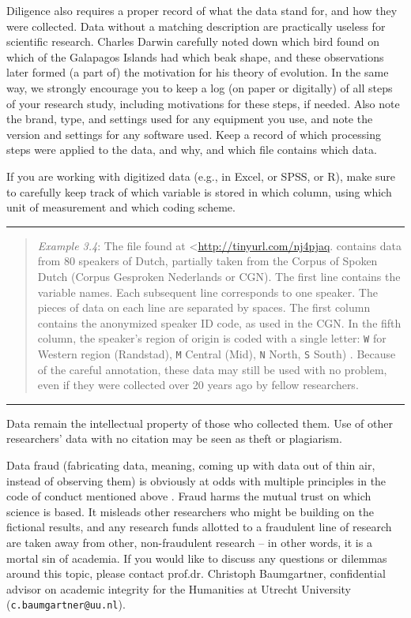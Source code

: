 \documentclass[
]{book}
\begin{document}
Diligence also requires a proper record of what the data stand for, and how they were collected. Data without a matching description are practically useless for scientific research. Charles Darwin carefully noted down which bird found on which of the Galapagos Islands had which beak shape, and these observations later formed (a part of) the motivation for his theory of evolution. In the same way, we strongly encourage you to keep a log (on paper or digitally) of all steps of your research study, including motivations for these steps, if needed. Also note the brand, type, and settings used for any equipment you use, and note the version and settings for any software used. Keep a record of which processing steps were applied to the data, and why, and which file contains which data.

If you are working with digitized data (e.g., in Excel, or SPSS, or R), make sure to carefully keep track of which variable is stored in which column, using which unit of measurement and which coding scheme.

\begin{center}\rule{0.5\linewidth}{0.5pt}\end{center}

\begin{quote}
\emph{Example 3.4}: The file found at \textless{}\url{http://tinyurl.com/nj4pjaq}. contains data from 80 speakers of Dutch, partially taken from the Corpus of Spoken Dutch (Corpus Gesproken Nederlands or CGN). The first line contains the variable names. Each subsequent line corresponds to one speaker. The pieces of data on each line are separated by spaces. The first column contains the anonymized speaker ID code, as used in the CGN. In the fifth column, the speaker's region of origin is coded with a single letter:
\texttt{W} for Western region (Randstad), \texttt{M} Central (Mid), \texttt{N} North, \texttt{S} South) \citep{Quene08}. Because of the careful annotation, these data may still be used with no problem, even if they were collected over 20 years ago by fellow researchers.
\end{quote}

\begin{center}\rule{0.5\linewidth}{0.5pt}\end{center}

Data remain the intellectual property of those who collected them. Use of other researchers' data with no citation may be seen as theft or plagiarism.

Data fraud (fabricating data, meaning, coming up with data out of thin air, instead of observing them) is obviously at odds with multiple principles in the code of conduct mentioned above \citep{VSNU18}. Fraud harms the mutual trust on which science is based. It misleads other researchers who might be building on the fictional results, and any research funds allotted to a fraudulent line of research are taken away from other, non-fraudulent research -- in other words, it is a mortal sin of academia. If you would like to discuss any questions or dilemmas around this topic, please contact
prof.dr. Christoph Baumgartner, confidential advisor on academic integrity for the Humanities at Utrecht University (\texttt{c.baumgartner@uu.nl}).
\end{document}
